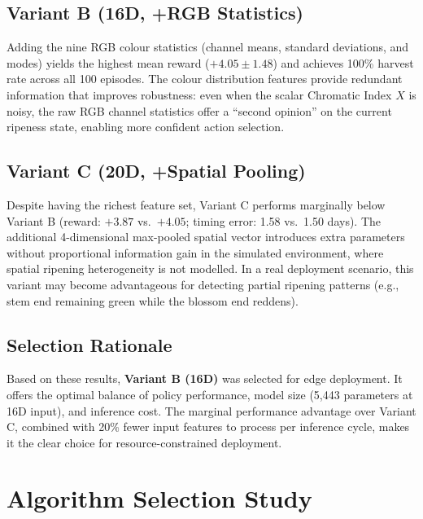     \subsection{Variant B (16D, +RGB Statistics)}

    Adding the nine RGB colour statistics (channel means, standard deviations, and modes) yields the highest mean reward ($+4.05 \pm 1.48$) and achieves 100\% harvest rate across all 100 episodes. The colour distribution features provide redundant information that improves robustness: even when the scalar Chromatic Index $X$ is noisy, the raw RGB channel statistics offer a ``second opinion'' on the current ripeness state, enabling more confident action selection.

    \subsection{Variant C (20D, +Spatial Pooling)}

    Despite having the richest feature set, Variant C performs marginally below Variant B (reward: $+3.87$ vs.\ $+4.05$; timing error: 1.58 vs.\ 1.50 days). The additional 4-dimensional max-pooled spatial vector introduces extra parameters without proportional information gain in the simulated environment, where spatial ripening heterogeneity is not modelled. In a real deployment scenario, this variant may become advantageous for detecting partial ripening patterns (e.g., stem end remaining green while the blossom end reddens).

    \subsection{Selection Rationale}

    Based on these results, \textbf{Variant B (16D)} was selected for edge deployment. It offers the optimal balance of policy performance, model size (5,443 parameters at 16D input), and inference cost. The marginal performance advantage over Variant C, combined with 20\% fewer input features to process per inference cycle, makes it the clear choice for resource-constrained deployment.



\section{Algorithm Selection Study}
    \label{sec:Algorithm Selection}

